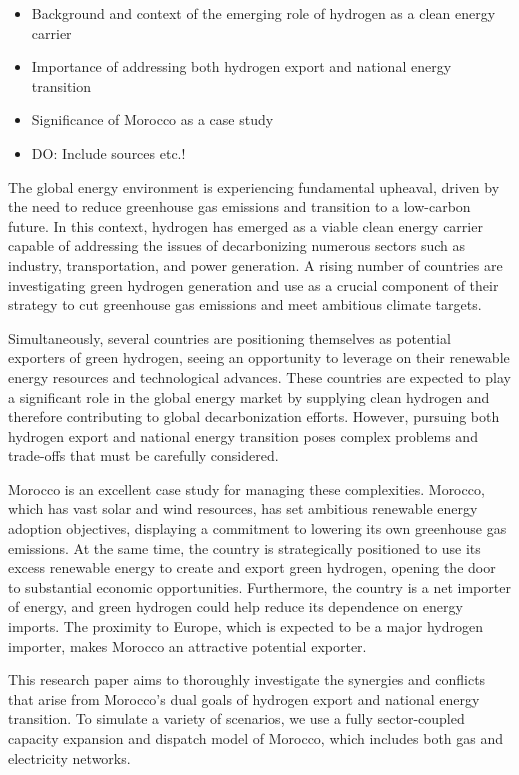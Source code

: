 

\begin{itemize}
    \item Background and context of the emerging role of hydrogen as a clean energy carrier
    \item Importance of addressing both hydrogen export and national energy transition
    \item Significance of Morocco as a case study
    \item DO: Include sources etc.!
\end{itemize}


The global energy environment is experiencing fundamental upheaval, driven by the need to reduce greenhouse gas emissions and transition to a low-carbon future. In this context, hydrogen has emerged as a viable clean energy carrier capable of addressing the issues of decarbonizing numerous sectors such as industry, transportation, and power generation. A rising number of countries are investigating green hydrogen generation and use as a crucial component of their strategy to cut greenhouse gas emissions and meet ambitious climate targets.

Simultaneously, several countries are positioning themselves as potential exporters of green hydrogen, seeing an opportunity to leverage on their renewable energy resources and technological advances. These countries are expected to play a significant role in the global energy market by supplying clean hydrogen and therefore contributing to global decarbonization efforts. However, pursuing both hydrogen export and national energy transition poses complex problems and trade-offs that must be carefully considered.

Morocco is an excellent case study for managing these complexities. Morocco, which has vast solar and wind resources, has set ambitious renewable energy adoption objectives, displaying a commitment to lowering its own greenhouse gas emissions. At the same time, the country is strategically positioned to use its excess renewable energy to create and export green hydrogen, opening the door to substantial economic opportunities. Furthermore, the country is a net importer of energy, and green hydrogen could help reduce its dependence on energy imports. The proximity to Europe, which is expected to be a major hydrogen importer, makes Morocco an attractive potential exporter.

This research paper aims to thoroughly investigate the synergies and conflicts that arise from Morocco's dual goals of hydrogen export and national energy transition. To simulate a variety of scenarios, we use a fully sector-coupled capacity expansion and dispatch model of Morocco, which includes both gas and electricity networks.

